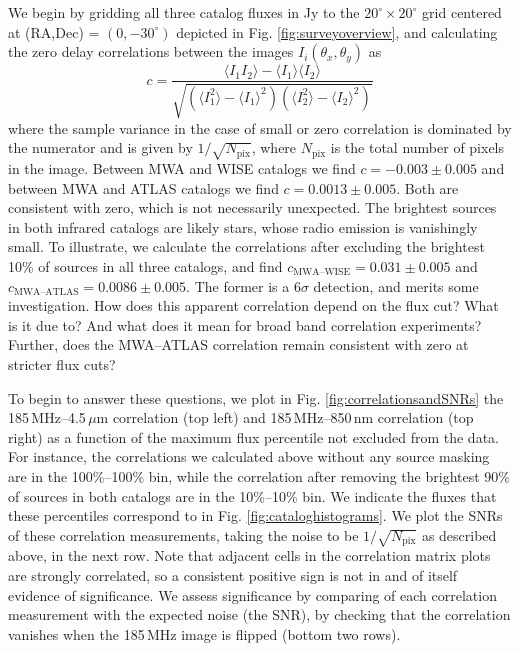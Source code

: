 \documentclass[preprint]{aastex}
\begin{document}
We begin by gridding all three catalog fluxes in Jy to the $20^\circ\times20^\circ$ grid centered at (RA,Dec) = $(0, -30^\circ)$ depicted in Fig. \ref{fig:surveyoverview}, and calculating the zero delay correlations between the images $I_i(\theta_x,\theta_y)$ as
\begin{equation}
	c = \frac{\langle I_1I_2\rangle-\langle I_1\rangle\langle I_2\rangle}{\sqrt{(\langle I_1^2\rangle -\langle I_1\rangle^2)(\langle I_2^2\rangle -\langle I_2\rangle^2)}}
\end{equation}
where the sample variance in the case of small or zero correlation is dominated by the numerator and is given by $1/\sqrt{N_\text{pix}}$, where $N_\text{pix}$ is the total number of pixels in the image. Between MWA and WISE catalogs we find $c=-0.003\pm0.005$ and between MWA and ATLAS catalogs we find $c=0.0013\pm0.005$. Both are consistent with zero, which is not necessarily unexpected. The brightest sources in both infrared catalogs are likely stars, whose radio emission is vanishingly small. To illustrate, we calculate the correlations after excluding the brightest 10\% of sources in all three catalogs, and find $c_\text{MWA--WISE}=0.031\pm0.005$ and $c_\text{MWA--ATLAS}=0.0086\pm0.005$. The former is a $6\sigma$ detection, and merits some investigation. How does this apparent correlation depend on the flux cut? What is it due to? And what does it mean for broad band correlation experiments? Further, does the MWA--ATLAS correlation remain consistent with zero at stricter flux cuts?

To begin to answer these questions, we plot in Fig. \ref{fig:correlationsandSNRs} the 185\,MHz--4.5\,$\mu$m correlation (top left) and 185\,MHz--850\,nm correlation (top right) as a function of the maximum flux percentile not excluded from the data. For instance, the correlations we calculated above without any source masking are in the 100\%--100\% bin, while the correlation after removing the brightest 90\% of sources in both catalogs are in the 10\%--10\% bin. We indicate the fluxes that these percentiles correspond to in Fig. \ref{fig:cataloghistograms}. We plot the SNRs of these correlation measurements, taking the noise to be $1/\sqrt{N_\text{pix}}$ as described above, in the next row. Note that adjacent cells in the correlation matrix plots are strongly correlated, so a consistent positive sign is not in and of itself evidence of significance. We assess significance by comparing of each correlation measurement with the expected noise (the SNR), by checking that the correlation vanishes when the 185\,MHz image is flipped (bottom two rows).
\end{document}
